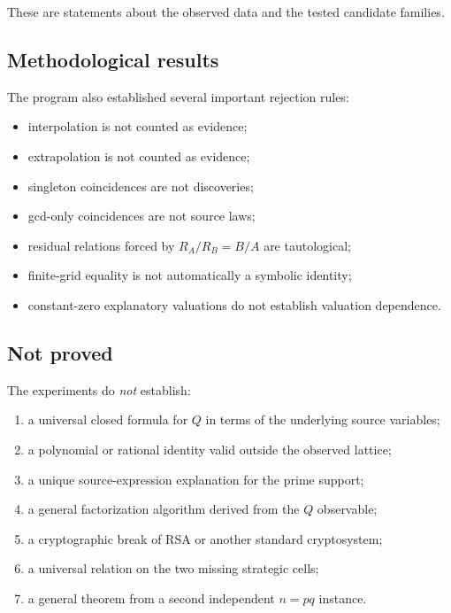 \documentclass[11pt,a4paper]{article}
\begin{document}
These are statements about the observed data and the tested candidate families.

\subsection{Methodological results}

The program also established several important rejection rules:

\begin{itemize}[leftmargin=1.5em]
  \item interpolation is not counted as evidence;
  \item extrapolation is not counted as evidence;
  \item singleton coincidences are not discoveries;
  \item gcd-only coincidences are not source laws;
  \item residual relations forced by $R_A/R_B=B/A$ are tautological;
  \item finite-grid equality is not automatically a symbolic identity;
  \item constant-zero explanatory valuations do not establish valuation dependence.
\end{itemize}

\subsection{Not proved}

The experiments do \emph{not} establish:

\begin{enumerate}[leftmargin=1.5em]
  \item a universal closed formula for $Q$ in terms of the underlying source variables;
  \item a polynomial or rational identity valid outside the observed lattice;
  \item a unique source-expression explanation for the prime support;
  \item a general factorization algorithm derived from the $Q$ observable;
  \item a cryptographic break of RSA or another standard cryptosystem;
  \item a universal relation on the two missing strategic cells;
  \item a general theorem from a second independent $n=pq$ instance.
\end{enumerate}
\end{document}
